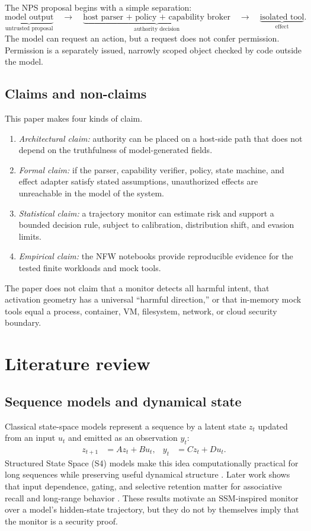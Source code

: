 \documentclass[11pt]{article}
\newcommand{\1}{\mathbf{1}}
\begin{document}
The NPS proposal begins with a simple separation:
\begin{equation}
  \underbrace{\text{model output}}_{\text{untrusted proposal}}
  \quad\longrightarrow\quad
  \underbrace{\text{host parser + policy + capability broker}}_{\text{authority decision}}
  \quad\longrightarrow\quad
  \underbrace{\text{isolated tool}}_{\text{effect}}.
\end{equation}
The model can request an action, but a request does not confer permission. Permission is a separately issued, narrowly scoped object checked by code outside the model.

\subsection{Claims and non-claims}
This paper makes four kinds of claim.
\begin{enumerate}
  \item \emph{Architectural claim:} authority can be placed on a host-side path that does not depend on the truthfulness of model-generated fields.
  \item \emph{Formal claim:} if the parser, capability verifier, policy, state machine, and effect adapter satisfy stated assumptions, unauthorized effects are unreachable in the model of the system.
  \item \emph{Statistical claim:} a trajectory monitor can estimate risk and support a bounded decision rule, subject to calibration, distribution shift, and evasion limits.
  \item \emph{Empirical claim:} the NFW notebooks provide reproducible evidence for the tested finite workloads and mock tools.
\end{enumerate}
The paper does not claim that a monitor detects all harmful intent, that activation geometry has a universal ``harmful direction,'' or that in-memory mock tools equal a process, container, VM, filesystem, network, or cloud security boundary.

\section{Literature review}

\subsection{Sequence models and dynamical state}
Classical state-space models represent a sequence by a latent state $z_t$ updated from an input $u_t$ and emitted as an observation $y_t$:
\begin{align}
 z_{t+1} &= A z_t + B u_t, & y_t &= C z_t + D u_t.
\end{align}
Structured State Space (S4) models make this idea computationally practical for long sequences while preserving useful dynamical structure \cite{gu2022s4}. Later work shows that input dependence, gating, and selective retention matter for associative recall and long-range behavior \cite{poli2023zoology}. These results motivate an SSM-inspired monitor over a model's hidden-state trajectory, but they do not by themselves imply that the monitor is a security proof.
\end{document}
